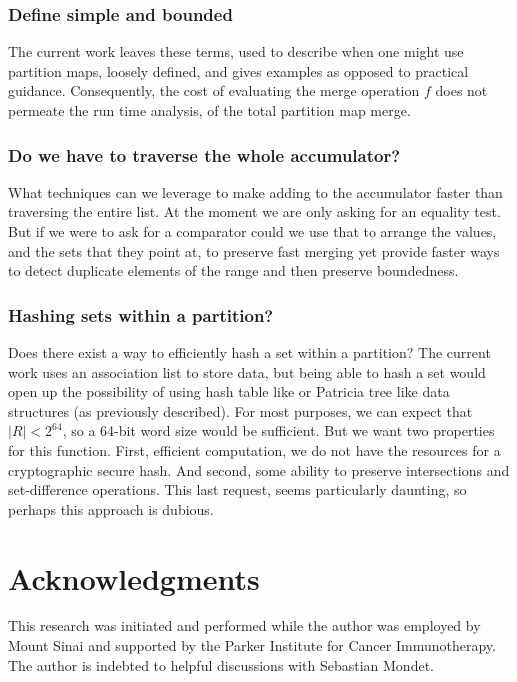 \documentclass{article}
\begin{document}
\subsubsection{Define simple and bounded}

The current work leaves these terms,
used to describe when one might use partition maps,
loosely defined,
and gives examples as opposed to practical guidance.
Consequently,
the cost of evaluating the merge operation $f$ does not permeate
the run time analysis,
of the total partition map merge.

\subsubsection{Do we have to traverse the whole accumulator?}

What techniques can we leverage to make adding to the accumulator
faster than traversing the entire list.
At the moment we are only asking for an equality test.
But if we were to ask for a comparator could we use that to arrange the values,
and the sets that they point at,
to preserve fast merging yet provide faster ways to detect duplicate elements
of the range and then preserve boundedness.

\subsubsection{Hashing sets within a partition?}

Does there exist a way to efficiently hash a set within a partition?
The current work uses an association list to store data, but being able to
hash a set would open up the possibility of using hash table like
or Patricia tree like data structures (as previously
described\cite{Okasaki1998}).
For most purposes,
we can expect that $|R|<2^{64}$,
so a 64-bit word size would be sufficient.
But we want two properties for this function.
First, efficient computation, we do not have the resources for a cryptographic
secure hash.
And second,
some ability to preserve intersections and set-difference operations.
This last request, seems particularly daunting,
so perhaps this approach is dubious.

\section{Acknowledgments}

This research was initiated and performed while the author was employed by
Mount Sinai and supported by the Parker Institute for Cancer Immunotherapy.
The author is indebted to helpful discussions with Sebastian Mondet.

\clearpage



\end{document}
